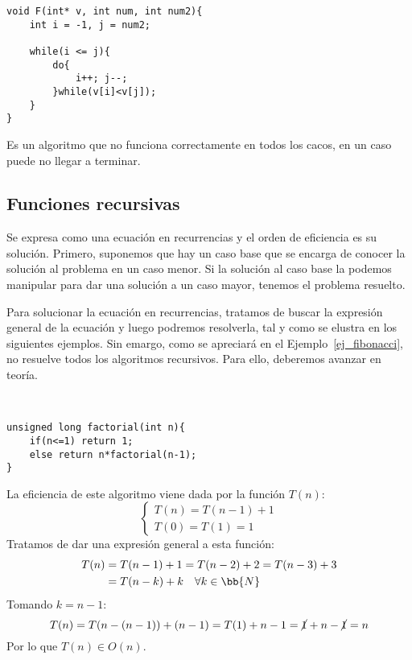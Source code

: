 \begin{ejemplo}
\begin{listing}[H]
\begin{verbatim}
void F(int* v, int num, int num2){
    int i = -1, j = num2;
    
    while(i <= j){
        do{
            i++; j--;
        }while(v[i]<v[j]);
    }
}
\end{verbatim}
\end{listing}
Es un algoritmo que no funciona correctamente en todos los cacos, en un caso puede no llegar a terminar.
\end{ejemplo}

\subsection{Funciones recursivas}
Se expresa como una ecuación en recurrencias y el orden de eficiencia es su solución.
Primero, suponemos que hay un caso base que se encarga de conocer la solución al problema en un caso menor.
Si la solución al caso base la podemos manipular para dar una solución a un caso mayor, tenemos el problema resuelto.

Para solucionar la ecuación en recurrencias, tratamos de buscar la expresión general de la ecuación y luego podremos resolverla, tal y como se elustra en los siguientes ejemplos. Sin emargo, como se apreciará en el Ejemplo~\ref{ej_fibonacci}, no resuelve todos los algoritmos recursivos. Para ello, deberemos avanzar en teoría.
\begin{ejemplo}[Factorial]
\ \\
\begin{listing}[H]
\begin{verbatim}
unsigned long factorial(int n){
    if(n<=1) return 1;
    else return n*factorial(n-1);
}
\end{verbatim}
\end{listing}
La eficiencia de este algoritmo viene dada por la función $T(n)$:
\begin{equation*}
    \left\{ \begin{array}{l}
        T(n) = T(n-1)+1\\
        T(0) = T(1)=1
    \end{array}\right.
\end{equation*}
Tratamos de dar una expresión general a esta función:
\begin{align*}
    T(n) &= T(n-1)+1 = T(n-2)+2 = T(n-3)+3\\
    &= T(n-k)+k\quad \forall k \in \bb{N}
\end{align*}
Tomando $k = n-1$:
\begin{equation*}
    T(n) = T(n-(n-1))+(n-1) = T(1) + n-1 = \cancel{1}+n-\cancel{1} = n
\end{equation*}
Por lo que $T(n) \in O(n)$.
\end{ejemplo}

